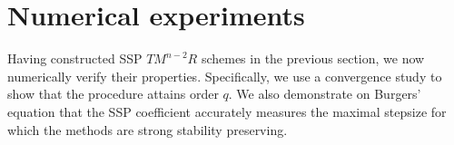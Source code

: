 \section{Numerical experiments}\label{sec:numerics}
Having constructed SSP $TM^{n-2}R$ schemes in the previous
section, we now numerically verify their properties.
Specifically, we use a convergence study to show that the procedure
attains order $q$.  We also demonstrate on Burgers' equation that the
SSP coefficient accurately measures the maximal stepsize for which the
methods are strong stability preserving.
%

